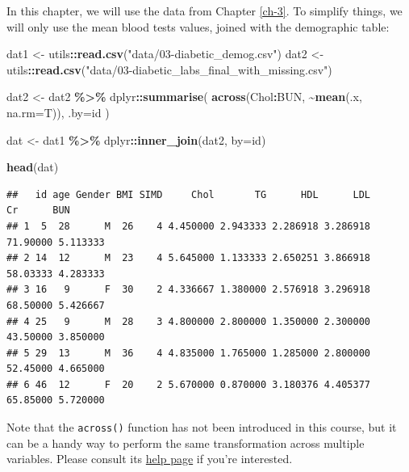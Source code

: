 \documentclass[
]{book}
\newenvironment{Shaded}{\begin{snugshade}}{\end{snugshade}}
\newcommand{\AttributeTok}[1]{\textcolor[rgb]{0.13,0.29,0.53}{#1}}
\newcommand{\FunctionTok}[1]{\textcolor[rgb]{0.13,0.29,0.53}{\textbf{#1}}}
\newcommand{\NormalTok}[1]{#1}
\newcommand{\OtherTok}[1]{\textcolor[rgb]{0.56,0.35,0.01}{#1}}
\newcommand{\SpecialCharTok}[1]{\textcolor[rgb]{0.81,0.36,0.00}{\textbf{#1}}}
\newcommand{\StringTok}[1]{\textcolor[rgb]{0.31,0.60,0.02}{#1}}
\begin{document}
In this chapter, we will use the data from Chapter \ref{ch-3}. To simplify things, we will only use the mean blood tests values, joined with the demographic table:

\begin{Shaded}
\begin{Highlighting}[]
\NormalTok{dat1 }\OtherTok{\textless{}{-}}\NormalTok{ utils}\SpecialCharTok{::}\FunctionTok{read.csv}\NormalTok{(}\StringTok{"data/03{-}diabetic\_demog.csv"}\NormalTok{)}
\NormalTok{dat2 }\OtherTok{\textless{}{-}}\NormalTok{ utils}\SpecialCharTok{::}\FunctionTok{read.csv}\NormalTok{(}\StringTok{"data/03{-}diabetic\_labs\_final\_with\_missing.csv"}\NormalTok{)}

\NormalTok{dat2 }\OtherTok{\textless{}{-}}\NormalTok{ dat2 }\SpecialCharTok{\%\textgreater{}\%} 
\NormalTok{  dplyr}\SpecialCharTok{::}\FunctionTok{summarise}\NormalTok{(}
    \FunctionTok{across}\NormalTok{(Chol}\SpecialCharTok{:}\NormalTok{BUN, }\SpecialCharTok{\textasciitilde{}}\FunctionTok{mean}\NormalTok{(.x, }\AttributeTok{na.rm=}\NormalTok{T)), }
    \AttributeTok{.by=}\NormalTok{id}
\NormalTok{  )}

\NormalTok{dat }\OtherTok{\textless{}{-}}\NormalTok{ dat1 }\SpecialCharTok{\%\textgreater{}\%} 
\NormalTok{  dplyr}\SpecialCharTok{::}\FunctionTok{inner\_join}\NormalTok{(dat2, }\AttributeTok{by=}\StringTok{\textquotesingle{}id\textquotesingle{}}\NormalTok{)}

\FunctionTok{head}\NormalTok{(dat)}
\end{Highlighting}
\end{Shaded}

\begin{verbatim}
##   id age Gender BMI SIMD     Chol       TG      HDL      LDL       Cr      BUN
## 1  5  28      M  26    4 4.450000 2.943333 2.286918 3.286918 71.90000 5.113333
## 2 14  12      M  23    4 5.645000 1.133333 2.650251 3.866918 58.03333 4.283333
## 3 16   9      F  30    2 4.336667 1.380000 2.576918 3.296918 68.50000 5.426667
## 4 25   9      M  28    3 4.800000 2.800000 1.350000 2.300000 43.50000 3.850000
## 5 29  13      M  36    4 4.835000 1.765000 1.285000 2.800000 52.45000 4.665000
## 6 46  12      F  20    2 5.670000 0.870000 3.180376 4.405377 65.85000 5.720000
\end{verbatim}

Note that the \texttt{across()} function has not been introduced in this course, but it can be a handy way to perform the same transformation across multiple variables. Please consult its \href{https://dplyr.tidyverse.org/reference/across.html}{help page} if you're interested.
\end{document}
